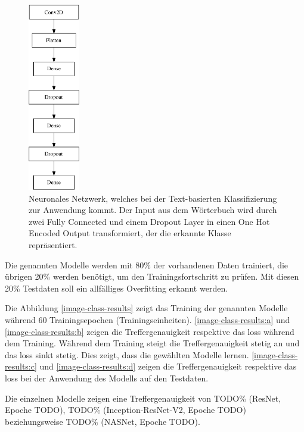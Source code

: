 \begin{figure}[h]
    \caption{Neuronales Netzwerk, welches bei der Text-basierten Klassifizierung zur Anwendung kommt. Der Input aus dem Wörterbuch wird durch zwei Fully Connected und einem Dropout Layer in einen One Hot Encoded Output transformiert, der die erkannte Klasse repräsentiert.}
    \label{image-classification-model}
    \centering
    \includegraphics[width=0.2\textwidth]{graphics/image-classification-results/model.pdf}
\end{figure}

Die genannten Modelle werden mit 80\% der vorhandenen Daten trainiert, die übrigen 20\% werden benötigt, um den Trainingsfortschritt zu prüfen. Mit diesen 20\% Testdaten soll ein allfälliges Overfitting erkannt werden.

Die Abbildung \ref{image-class-results} zeigt das Training der genannten Modelle während 60 Trainingsepochen (Trainingseinheiten). \ref{image-class-results:a} und \ref{image-class-results:b} zeigen die Treffergenauigkeit respektive das loss während dem Training. Während dem Training steigt die Treffergenauigkeit stetig an und das loss sinkt stetig. Dies zeigt, dass die gewählten Modelle lernen. \ref{image-class-results:c} und \ref{image-class-results:d} zeigen die Treffergenauigkeit respektive das loss bei der Anwendung des Modells auf den Testdaten. 

Die einzelnen Modelle zeigen eine Treffergenauigkeit von TODO\% (ResNet, Epoche TODO), TODO\% (Inception-ResNet-V2, Epoche TODO) beziehungsweise TODO\% (NASNet, Epoche TODO).

